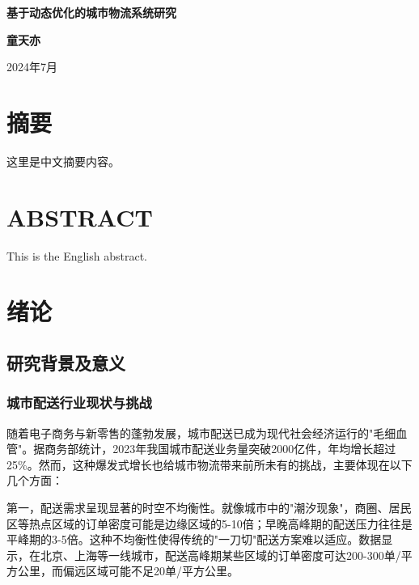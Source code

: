 \documentclass[12pt,a4paper,twoside]{ctexbook}
\let\oldchapter\chapter
\renewcommand{\chapter}{\clearpage\oldchapter}  %
\begin{document}
    
\frontmatter
{}

\begin{titlepage}
\begin{center}
\vspace*{2cm}
{\huge\bfseries 基于动态优化的城市物流系统研究\par}
\vspace{2cm}
{\large\bfseries 童天亦\par}
\vspace{1cm}
{\large 2024年7月\par}
\end{center}
\end{titlepage}

\chapter*{摘要}
这里是中文摘要内容。

\chapter*{ABSTRACT}
This is the English abstract.

\tableofcontents

\mainmatter
{}

\chapter{绪论}
\section{研究背景及意义}
\subsection{城市配送行业现状与挑战}
随着电子商务与新零售的蓬勃发展，城市配送已成为现代社会经济运行的"毛细血管"。据商务部统计，2023年我国城市配送业务量突破2000亿件，年均增长超过25\%。然而，这种爆发式增长也给城市物流带来前所未有的挑战，主要体现在以下几个方面：

第一，配送需求呈现显著的时空不均衡性。就像城市中的"潮汐现象"，商圈、居民区等热点区域的订单密度可能是边缘区域的5-10倍；早晚高峰期的配送压力往往是平峰期的3-5倍。这种不均衡性使得传统的"一刀切"配送方案难以适应。数据显示，在北京、上海等一线城市，配送高峰期某些区域的订单密度可达200-300单/平方公里，而偏远区域可能不足20单/平方公里。
\end{document}
